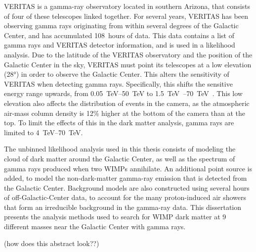 VERITAS is a gamma-ray observatory located in southern Arizona, that consists of four of these telescopes linked together.
For several years, VERITAS has been observing gamma rays originating from within several degrees of the Galactic Center, and has accumulated \SI{108}{hours} of data.
This data contains a list of gamma rays and VERITAS detector information, and is used in a likelihood analysis.
Due to the latitude of the VERITAS observatory and the position of the Galactic Center in the sky, VERITAS must point its telescopes at a low elevation (\nicetilde\ang{28}) in order to observe the Galactic Center.
This alters the sensitivity of VERITAS when detecting gamma rays.
Specifically, this shifts the sensitive energy range upwards, from \SIrange{0.05}{50}{\TeV} to \SIrange{1.5}{70}{\TeV{}}.
This low elevation also affects the distribution of events in the camera, as the atmospheric air-mass column density is 12\% higher at the bottom of the camera than at the top.
To limit the effects of this in the dark matter analysis, gamma rays are limited to \SIrange{4}{70}{\TeV}.

The unbinned likelihood analysis used in this thesis consists of modeling the cloud of dark matter around the Galactic Center, as well as the spectrum of gamma rays produced when two WIMPs annihilate.
An additional point source is added, to model the non-dark-matter gamma-ray emission that is detected from the Galactic Center.
Background models are also constructed using several hours of off-Galactic-Center data, to account for the many proton-induced air showers that form an irreducible background in the gamma-ray data.
This dissertation presents the analysis methods used to search for WIMP dark matter at 9 different masses near the Galactic Center with \TeV{} gamma rays.

{\color{red}(how does this abstract look??)}


\cleartoevenpage[\thispagestyle{plain}]
\null
